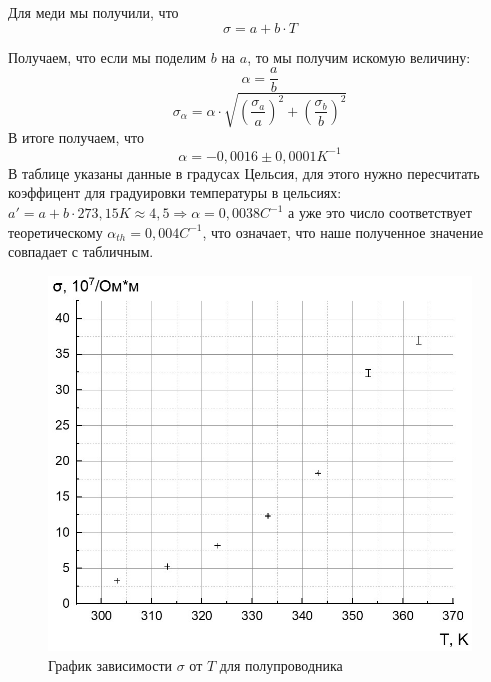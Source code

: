 \documentclass[a4paper, 12pt]{article}%
\begin{document}
Для меди мы получили, что 
\[\sigma = a + b \cdot T\]

Получаем, что если мы поделим $b$ на $a$, то мы получим искомую величину:
\[\alpha = \frac{a}{b}\]
\[\sigma_{\alpha} = \alpha \cdot \sqrt{\left(\frac{\sigma_a}{a}\right)^2 + \left(\frac{\sigma_b}{b}\right)^2}\]
В итоге получаем, что 
\[\alpha = -0,0016 \pm 0,0001 K^{-1}\]
В таблице указаны данные в градусах Цельсия, для этого нужно пересчитать коэффицент для градуировки температуры в цельсиях: $a' = a + b \cdot 273,15 K \approx 4,5 \Rightarrow \alpha = 0,0038 C^{-1}$ а уже это число соответствует теоретическому $\alpha_{th} = 0,004 C^{-1}$, что означает, что наше полученное значение совпадает с табличным.

\begin{figure}[h]
\begin{center}
\includegraphics[width = \textwidth]{3}
\caption{График зависимости $\sigma$ от $T$ для полупроводника}
\end{center}
\end{figure}
\end{document}
